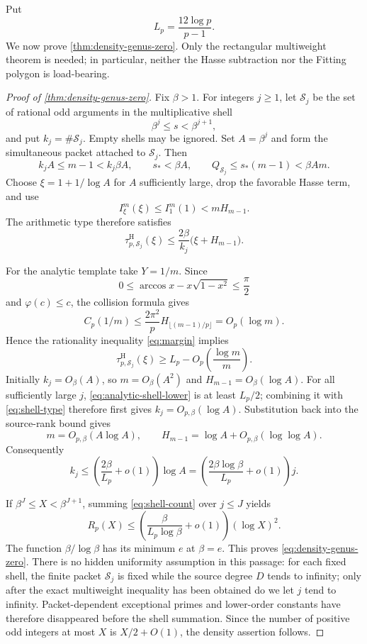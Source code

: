 \documentclass[11pt]{article}
\theoremstyle{definition}
\theoremstyle{remark}
\begin{document}
Put
\[
 L_p=\frac{12\log p}{p-1}.
\]
We now prove \cref{thm:density-genus-zero}.  Only the rectangular multiweight theorem
is needed; in particular, neither the Hasse subtraction nor the Fitting
polygon is load-bearing.

\begin{proof}[Proof of \cref{thm:density-genus-zero}]
Fix $\beta>1$.  For integers $j\ge1$, let $\mathcal S_j$ be the set of
rational odd arguments in the multiplicative shell
\[
 \beta^j\le s<\beta^{j+1},
\]
and put $k_j=\#\mathcal S_j$.  Empty shells may be ignored.  Set
$A=\beta^j$ and form the simultaneous packet attached to $\mathcal S_j$.
Then
\[
 k_jA\le m-1<k_j\beta A,
 \qquad s_*<\beta A,
 \qquad Q_{\mathcal S_j}\le s_*(m-1)<\beta A m.
\]
Choose $\xi=1+1/\log A$ for $A$ sufficiently large, drop the favorable
Hasse term, and use
\[
 I_\xi^m(\xi)\le I_1^m(1)<mH_{m-1}.
\]
The arithmetic type therefore satisfies
\begin{equation}\label{eq:shell-type}
 \tau^{\mathrm H}_{p,\mathcal S_j}(\xi)
 \le\frac{2\beta}{k_j}\bigl(\xi+H_{m-1}\bigr).
\end{equation}

For the analytic template take $Y=1/m$.  Since
\[
 0\le\arccos x-x\sqrt{1-x^2}\le\frac\pi2
\]
and $\varphi(c)\le c$, the collision formula gives
\begin{equation}\label{eq:collision-log-bound}
 C_p(1/m)
 \le\frac{2\pi^2}{p}H_{\lfloor(m-1)/p\rfloor}
 =O_p(\log m).
\end{equation}
Hence the rationality inequality \eqref{eq:margin} implies
\begin{equation}\label{eq:analytic-shell-lower}
 \tau^{\mathrm H}_{p,\mathcal S_j}(\xi)
 \ge L_p-O_p\left(\frac{\log m}{m}\right).
\end{equation}
Initially $k_j=O_\beta(A)$, so $m=O_\beta(A^2)$ and
$H_{m-1}=O_\beta(\log A)$.  For all sufficiently large $j$,
\eqref{eq:analytic-shell-lower} is at least $L_p/2$; combining it with
\eqref{eq:shell-type} therefore first gives
$k_j=O_{p,\beta}(\log A)$.  Substitution back into the source-rank bound gives
\[
 m=O_{p,\beta}(A\log A),
 \qquad
 H_{m-1}=\log A+O_{p,\beta}(\log\log A).
\]
Consequently
\begin{equation}\label{eq:shell-count}
 k_j\le
 \left(\frac{2\beta}{L_p}+o(1)\right)\log A
 =\left(\frac{2\beta\log\beta}{L_p}+o(1)\right)j.
\end{equation}

If $\beta^J\le X<\beta^{J+1}$, summing
\eqref{eq:shell-count} over $j\le J$ yields
\[
 R_p(X)
 \le\left(\frac{\beta}{L_p\log\beta}+o(1)\right)(\log X)^2.
\]
The function $\beta/\log\beta$ has its minimum $e$ at $\beta=e$.  This proves
\eqref{eq:density-genus-zero}.  There is no hidden uniformity assumption in this
passage: for each fixed shell, the finite packet $\mathcal S_j$ is fixed while
the source degree $D$ tends to infinity; only after the exact multiweight
inequality has been obtained do we let $j$ tend to infinity.  Packet-dependent
exceptional primes and lower-order constants have therefore disappeared before
the shell summation.  Since the number of positive odd integers at most $X$ is
$X/2+O(1)$, the density assertion follows.
\end{proof}
\end{document}
